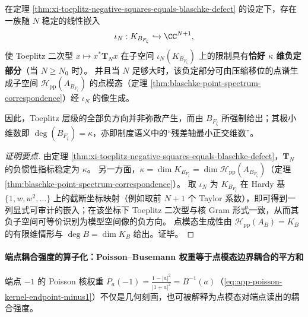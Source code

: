 \begin{theorem}\label{thm:xi-toeplitz-witness-generated-by-model-space}
在定理 \ref{thm:xi-toeplitz-negative-squares-equals-blaschke-defect} 的设定下，存在一族随 \(N\) 稳定的线性嵌入
\[
\iota_N:K_{B_{F_{\zeta}}}\hookrightarrow \CC^{N+1},
\]
使 Toeplitz 二次型 \(x\mapsto x^\ast \mathbf{T}_N x\) 在子空间 \(\iota_N(K_{B_{F_{\zeta}}})\) 上的限制具有\textbf{恰好 \(\kappa\) 维负定部分}（当 \(N\ge N_0\) 时）。
并且当 \(N\) 足够大时，该负定部分可由压缩移位的点谱生成子空间
\(\mathcal{H}_{\mathrm{pp}}(A_{B_{F_{\zeta}}})\)
的点模态（定理 \ref{thm:blaschke-point-spectrum-correspondence}）经 \(\iota_N\) 的像生成。
\par
因此，Toeplitz 层级的全部负方向并非弥散产生，而由 \(B_{F_{\zeta}}\) 所强制给出；其极小维数即 \(\deg(B_{F_{\zeta}})=\kappa\)，亦即制度语义中的“残差轴最小正交维数”。
\end{theorem}

\begin{proof}[证明要点]
由定理 \ref{thm:xi-toeplitz-negative-squares-equals-blaschke-defect}，\(\mathbf{T}_N\) 的负惯性指标稳定为 \(\kappa\)。
另一方面，\(\kappa=\dim K_{B_{F_\zeta}}=\dim\mathcal H_{\mathrm{pp}}(A_{B_{F_\zeta}})\)（定理 \ref{thm:blaschke-point-spectrum-correspondence}）。
取 \(\iota_N\) 为 \(K_{B_{F_\zeta}}\) 在 Hardy 基 \(\{1,w,w^2,\dots\}\) 上的截断坐标映射（例如取前 \(N{+}1\) 个 Taylor 系数），即可得到一列显式可审计的嵌入；在该坐标下 Toeplitz 二次型与核 Gram 形式一致，从而其负子空间可等价识别为模型空间像的负方向。
点模态生成性由 \(\mathcal H_{\mathrm{pp}}(A_B)=K_B\) 的有限维情形与 \(\deg B=\dim K_B\) 给出。证毕。
\end{proof}

\paragraph{端点耦合强度的算子化：Poisson--Busemann 权重等于点模态边界耦合的平方和}
端点 \(-1\) 的 Poisson 核权重 \(P_a(-1)=\frac{1-|a|^2}{|1+a|^2}=B^{-1}(a)\)（\eqref{eq:app-poisson-kernel-endpoint-minus1}）不仅是几何刻画，也可被解释为点模态对端点读出的耦合强度。

